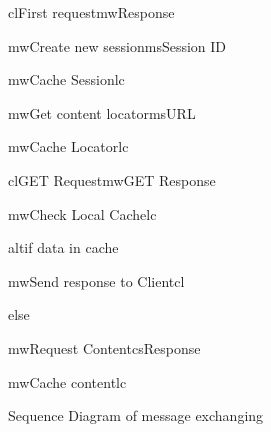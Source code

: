 \begin{figure}[h]
\begin{center}

	\resizebox{1.0\textwidth}{0.8\textwidth} {

	\begin{sequencediagram}

	\begin{call}{cl}{First request}{mw}{Response}

		\begin{call}{mw}{Create new session}{ms}{Session ID}
		\end{call}

		\begin{call}{mw}{Cache Session}{lc}{}
		\end{call}

		\begin{call}{mw}{Get content locator}{ms}{URL}
		\end{call}

		\begin{call}{mw}{Cache Locator}{lc}{}
		\end{call}

	\end{call}

	\begin{call}{cl}{GET Request}{mw}{GET Response}
		
		\begin{call}{mw}{Check Local Cache}{lc}{}
		\end{call}

		\begin{sdblock}{alt}{if data in cache}
			\begin{call}{mw}{Send response to Client}{cl}{}
			\end{call}
			\begin{sdblock}{else}{}
				\begin{call}{mw}{Request Content}{cs}{Response}
				\end{call}
				\begin{call}{mw}{Cache content}{lc}{}
				\end{call}
			\end{sdblock}
		\end{sdblock}


	\end{call}

	\end{sequencediagram}
	}

\end{center}
\caption{Sequence Diagram of message exchanging}
\label{fig:arch_uml}
\end{figure}

